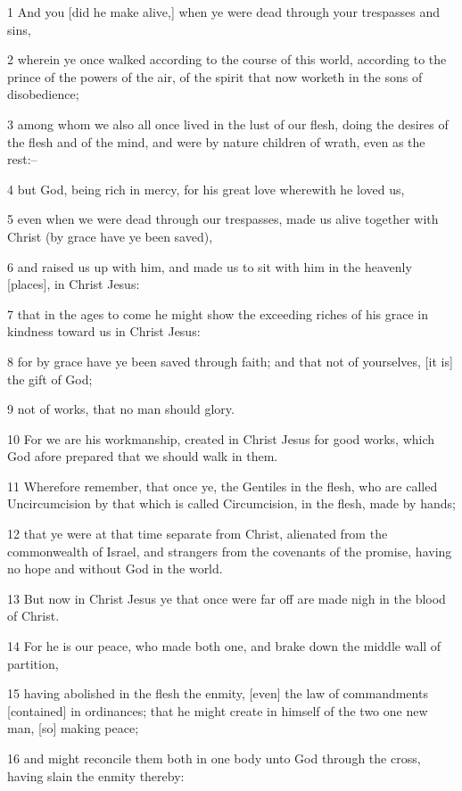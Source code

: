 \par 1 And you [did he make alive,] when ye were dead through your trespasses and sins,
\par 2 wherein ye once walked according to the course of this world, according to the prince of the powers of the air, of the spirit that now worketh in the sons of disobedience;
\par 3 among whom we also all once lived in the lust of our flesh, doing the desires of the flesh and of the mind, and were by nature children of wrath, even as the rest:--
\par 4 but God, being rich in mercy, for his great love wherewith he loved us,
\par 5 even when we were dead through our trespasses, made us alive together with Christ (by grace have ye been saved),
\par 6 and raised us up with him, and made us to sit with him in the heavenly [places], in Christ Jesus:
\par 7 that in the ages to come he might show the exceeding riches of his grace in kindness toward us in Christ Jesus:
\par 8 for by grace have ye been saved through faith; and that not of yourselves, [it is] the gift of God;
\par 9 not of works, that no man should glory.
\par 10 For we are his workmanship, created in Christ Jesus for good works, which God afore prepared that we should walk in them.
\par 11 Wherefore remember, that once ye, the Gentiles in the flesh, who are called Uncircumcision by that which is called Circumcision, in the flesh, made by hands;
\par 12 that ye were at that time separate from Christ, alienated from the commonwealth of Israel, and strangers from the covenants of the promise, having no hope and without God in the world.
\par 13 But now in Christ Jesus ye that once were far off are made nigh in the blood of Christ.
\par 14 For he is our peace, who made both one, and brake down the middle wall of partition,
\par 15 having abolished in the flesh the enmity, [even] the law of commandments [contained] in ordinances; that he might create in himself of the two one new man, [so] making peace;
\par 16 and might reconcile them both in one body unto God through the cross, having slain the enmity thereby:
